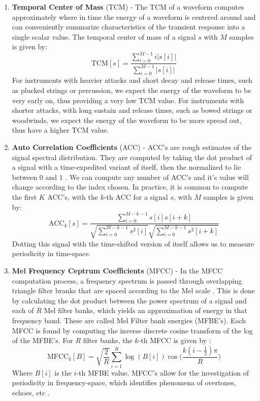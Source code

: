 \documentclass[conference,onecolumn,letterpaper]{IEEEtran}
\begin{document}
\begin{enumerate}
\item\textbf{Temporal Center of Mass} (TCM) - 
The TCM of a waveform computes approximately where in time the energy of a waveform is centered around and can conveniently summarize characteristics of the transient response into a single scalar value. The temporal center of mass of a signal $s$ with $M$ samples is given by:
\begin{equation}
    \label{eqn:TCM}
    \text{TCM}[s] = \frac{\sum_{i=0}^{M-1}i\big|s[i]\big|}{\sum_{i=0}^{M-1}\big|s[i]\big|}
\end{equation}
For instruments with heavier attacks and short decay and release times, such as plucked strings or percussion, we expect the energy of the waveform to be very early on, thus providing a very low TCM value. For instruments with shorter attacks, with long sustain and release times, such as bowed strings or woodwinds, we expect the energy of the waveform to be more spread out, thus have a higher TCM value.

\item\textbf{Auto Correlation Coefficients} (ACC) -
ACC's are rough estimates of the signal spectral distribution. They are computed by taking the dot product of a signal with a time-expedited variant of itself, then the normalized to lie between $0$ and $1$ \cite{Virtanen}. We can compute any number of ACC's and it's value will change according to the index chosen. In practice, it is common to compute the first $K$ ACC's, with the $k$-th ACC for a signal $s$, with $M$ samples is given by:
\begin{equation}
    \label{eqn:ACC}
    \text{ACC}_k[s] = \frac{\sum_{i=0}^{M-k-1}s[i]s[i+k]}{\sqrt{\sum_{i=0}^{M-k-1}s^2[i]}\sqrt{\sum_{i=0}^{M-k-1}s^2[i+k]}}
\end{equation}
Dotting this signal with the time-shifted version of itself allows us to measure periodicity in time-space. 

\item\textbf{Mel Frequency Ceptrum Coefficients} (MFCC) - 
In the MFCC computation process, a frequency spectrum is passed through overlapping triangle filter branks that are spaced according to the Mel scale \cite{Sahidullah}. This is done by calculating the dot product between the power spectrum of a signal and each of $R$ Mel filter banks, which yields an approximation of energy in that frequency band. These are called Mel Filter bank energies (MFBE's). Each MFCC is found by computing the inverse discrete cosine transform of the log of the MFBE's. For $R$ filter banks, the $k$-th MFCC is given by \cite{Virtanen}:
\begin{equation}
    \label{eqn:MFCC}
    \text{MFCC}_k[B] = \sqrt{\frac{2}{R}}\sum_{i=1}^{R}\log{(B[i])}
    \cos\Big(\frac{k(i-\frac{1}{2})\pi}{R}\Big)
\end{equation}
Where $B[i]$ is the $i$-th MFBE value. MFCC's allow for the investigation of periodicity in frequency-space, which identifies phenomena of overtones, echoes, etc \cite{Sahidullah,Virtanen}. 


\end{enumerate}
\end{document}
